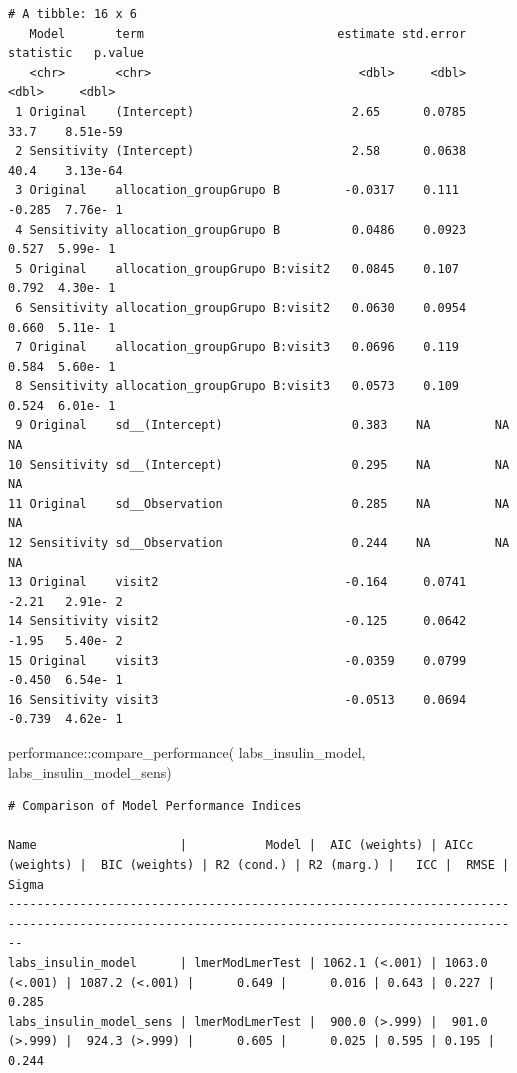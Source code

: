 \documentclass[
  12pt,
]{article}
\newenvironment{Shaded}{\begin{snugshade}}{\end{snugshade}}
\newcommand{\FunctionTok}[1]{\textcolor[rgb]{0.28,0.35,0.67}{#1}}
\newcommand{\NormalTok}[1]{\textcolor[rgb]{0.00,0.23,0.31}{#1}}
\newcommand{\SpecialCharTok}[1]{\textcolor[rgb]{0.37,0.37,0.37}{#1}}
\begin{document}
\begin{verbatim}
# A tibble: 16 x 6
   Model       term                           estimate std.error statistic   p.value
   <chr>       <chr>                             <dbl>     <dbl>     <dbl>     <dbl>
 1 Original    (Intercept)                      2.65      0.0785    33.7    8.51e-59
 2 Sensitivity (Intercept)                      2.58      0.0638    40.4    3.13e-64
 3 Original    allocation_groupGrupo B         -0.0317    0.111     -0.285  7.76e- 1
 4 Sensitivity allocation_groupGrupo B          0.0486    0.0923     0.527  5.99e- 1
 5 Original    allocation_groupGrupo B:visit2   0.0845    0.107      0.792  4.30e- 1
 6 Sensitivity allocation_groupGrupo B:visit2   0.0630    0.0954     0.660  5.11e- 1
 7 Original    allocation_groupGrupo B:visit3   0.0696    0.119      0.584  5.60e- 1
 8 Sensitivity allocation_groupGrupo B:visit3   0.0573    0.109      0.524  6.01e- 1
 9 Original    sd__(Intercept)                  0.383    NA         NA     NA       
10 Sensitivity sd__(Intercept)                  0.295    NA         NA     NA       
11 Original    sd__Observation                  0.285    NA         NA     NA       
12 Sensitivity sd__Observation                  0.244    NA         NA     NA       
13 Original    visit2                          -0.164     0.0741    -2.21   2.91e- 2
14 Sensitivity visit2                          -0.125     0.0642    -1.95   5.40e- 2
15 Original    visit3                          -0.0359    0.0799    -0.450  6.54e- 1
16 Sensitivity visit3                          -0.0513    0.0694    -0.739  4.62e- 1
\end{verbatim}

\begin{Shaded}
\begin{Highlighting}[]
\NormalTok{performance}\SpecialCharTok{::}\FunctionTok{compare\_performance}\NormalTok{(}
\NormalTok{    labs\_insulin\_model, }
\NormalTok{    labs\_insulin\_model\_sens) }
\end{Highlighting}
\end{Shaded}

\begin{verbatim}
# Comparison of Model Performance Indices

Name                    |           Model |  AIC (weights) | AICc (weights) |  BIC (weights) | R2 (cond.) | R2 (marg.) |   ICC |  RMSE | Sigma
----------------------------------------------------------------------------------------------------------------------------------------------
labs_insulin_model      | lmerModLmerTest | 1062.1 (<.001) | 1063.0 (<.001) | 1087.2 (<.001) |      0.649 |      0.016 | 0.643 | 0.227 | 0.285
labs_insulin_model_sens | lmerModLmerTest |  900.0 (>.999) |  901.0 (>.999) |  924.3 (>.999) |      0.605 |      0.025 | 0.595 | 0.195 | 0.244
\end{verbatim}
\end{document}
